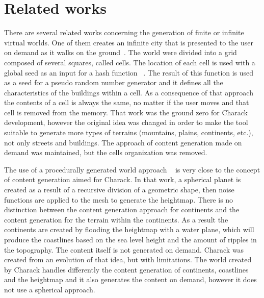 \documentclass[10pt, conference, compsocconf]{IEEEtran}
\begin{document}

\section{Related works}
\label{sec:related-work}

There are several related works concerning the generation of finite or infinite virtual worlds. One of them creates an infinite city that is presented to the user on demand as it walks on the ground~\cite{infinicity}. The world were divided into a grid composed of several squares, called cells. The location of each cell is used with a global seed as an input for a hash function ~\cite{wangHash}. The result of this function is used as a seed for a pseudo random number generator and it defines all the characteristics of the buildings within a cell. As a consequence of that approach the contents of a cell is always the same, no matter if the user moves and that cell is removed from the memory. That work was the ground zero for Charack development, however the original idea was changed in order to make the tool suitable to generate more types of terrains (mountains, plains, continents, etc.), not only streets and buildings. The approach of content generation made on demand was maintained, but the cells organization was removed.

The use of a procedurally generated world approach ~\cite{LindaOndrej2007} is very close to the concept of content generation aimed for Charack. In that work, a spherical planet is created as a result of a recursive division of a geometric shape, then noise functions are applied to the mesh to generate the heightmap. There is no distinction between the content generation approach for continents and the content generation for the terrain within the continents. As a result the continents are created by flooding the heightmap with a water plane, which will produce the coastlines based on the sea level height and the amount of ripples in the topography. The content itself is not generated on demand. Charack was created from an evolution of that idea, but with limitations. The world created by Charack handles differently the content generation of continents, coastlines and the heightmap and it also generates the content on demand, however it does not use a spherical approach.
\end{document}
